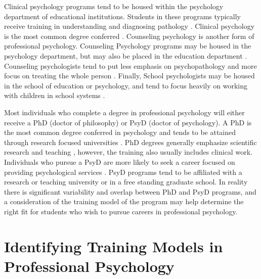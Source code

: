 \documentclass[
  11pt,
]{book}
\begin{document}
Clinical psychology programs tend to be housed within the psychology department of educational institutions. Students in these programs typically receive training in understanding and diagnosing pathology \citep{noauthor_counseling_nodate}. Clinical psychology is the most common degree conferred \citep{noauthor_types_nodate}. Counseling psychology is another form of professional psychology. Counseling Psychology programs may be housed in the psychology department, but may also be placed in the education department \citep{noauthor_types_nodate}. Counseling psychologists tend to put less emphasis on psychopathology and more focus on treating the whole person \citep{noauthor_counseling_nodate}. Finally, School psychologists may be housed in the school of education or psychology, and tend to focus heavily on working with children in school systems \citep{noauthor_types_nodate}.

Most individuals who complete a degree in professional psychology will either receive a PhD (doctor of philosophy) or PsyD (doctor of psychology). A PhD is the most common degree conferred in psychology and tends to be attained through research focused universities \citep{michalski_doctoral_nodate}. PhD degrees generally emphasize scientific research and teaching \citep{michalski_doctoral_nodate}, however, the training also usually includes clinical work. Individuals who pursue a PsyD are more likely to seek a career focused on providing psychological services \citep{michalski_doctoral_nodate}. PsyD programs tend to be affiliated with a research or teaching university or in a free standing graduate school. In reality there is significant variability and overlap between PhD and PsyD programs, and a consideration of the training model of the program may help determine the right fit for students who wish to pursue careers in professional psychology.

\section{Identifying Training Models in Professional Psychology}\label{identifying-training-models-in-professional-psychology}
\end{document}
